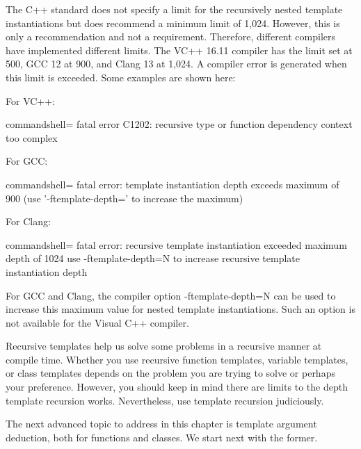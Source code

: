 The C++ standard does not specify a limit for the recursively nested template instantiations but does recommend a minimum limit of 1,024. However, this is only a recommendation and not a requirement. Therefore, different compilers have implemented different limits. The VC++ 16.11 compiler has the limit set at 500, GCC 12 at 900, and Clang 13 at 1,024. A compiler error is generated when this limit is exceeded. Some examples are shown here: 

For VC++:

\begin{tcblisting}{commandshell={}}
fatal error C1202: recursive type or function dependency
context too complex
\end{tcblisting}

For GCC:

\begin{tcblisting}{commandshell={}}
fatal error: template instantiation depth exceeds maximum of
900 (use '-ftemplate-depth=' to increase the maximum)
\end{tcblisting}

For Clang:

\begin{tcblisting}{commandshell={}}
fatal error: recursive template instantiation exceeded maximum
depth of 1024
use -ftemplate-depth=N to increase recursive template
instantiation depth
\end{tcblisting}

For GCC and Clang, the compiler option -ftemplate-depth=N can be used to increase this maximum value for nested template instantiations. Such an option is not available for the Visual C++ compiler.

Recursive templates help us solve some problems in a recursive manner at compile time. Whether you use recursive function templates, variable templates, or class templates depends on the problem you are trying to solve or perhaps your preference. However, you should keep in mind there are limits to the depth template recursion works. Nevertheless, use template recursion judiciously.

The next advanced topic to address in this chapter is template argument deduction, both for functions and classes. We start next with the former.





